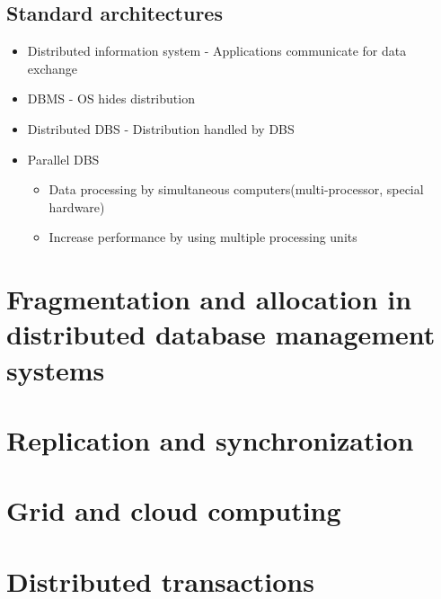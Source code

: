 \documentclass[10pt,a4paper]{article}
\begin{document}
\subsection{Standard architectures}
	\begin{itemize}
		\item Distributed information system - Applications communicate for data exchange
		\item DBMS - OS hides distribution
		\item Distributed DBS - Distribution handled by DBS
		\item Parallel DBS
		\begin{itemize}
			\item Data processing by simultaneous computers(multi-processor, special hardware)
			\item Increase performance by using multiple processing units
		\end{itemize}

	\end{itemize}

\section{Fragmentation and allocation in distributed database management systems}

\section{Replication and synchronization}

\section{Grid and cloud computing}

\section{Distributed transactions}

\end{document}
